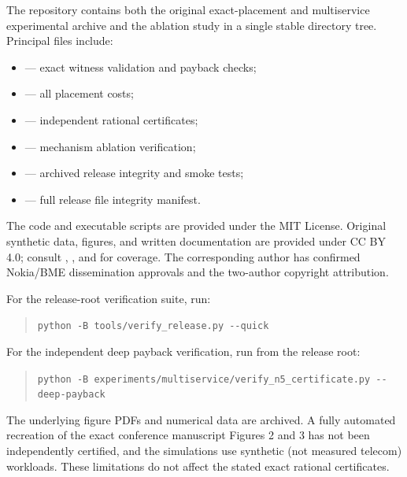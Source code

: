 \documentclass[10pt,a4paper]{article}
\begin{document}
The repository contains both the original exact-placement and multiservice experimental archive and the ablation study in a single stable directory tree. Principal files include:
\begin{itemize}[leftmargin=*,nosep]
\item {} --- exact witness validation and payback checks;
\item {} --- all placement costs;
\item {} --- independent rational certificates;
\item {} --- mechanism ablation verification;
\item {} --- archived release integrity and smoke tests;
\item {} --- full release file integrity manifest.
\end{itemize}
The code and executable scripts are provided under the MIT License. Original synthetic data, figures, and written documentation are provided under CC BY 4.0; consult , , and  for coverage. The corresponding author has confirmed Nokia/BME dissemination approvals and the two-author copyright attribution.

For the release-root verification suite, run:
\begin{quote}\small\verb|python -B tools/verify_release.py --quick|\end{quote}
For the independent deep payback verification, run from the release root:
\begin{quote}\small\verb|python -B experiments/multiservice/verify_n5_certificate.py --deep-payback|\end{quote}
The underlying figure PDFs and numerical data are archived. A fully automated recreation of the exact conference manuscript Figures 2 and 3 has not been independently certified, and the simulations use synthetic (not measured telecom) workloads. These limitations do not affect the stated exact rational certificates.
\end{document}
